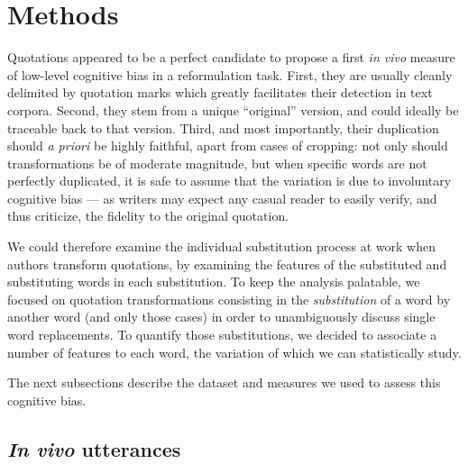 \section{Methods} %
\label{sec:protocol}

Quotations appeared to be a perfect candidate to propose a first \emph{in vivo} measure of low-level cognitive bias in a reformulation task. %
First, they are usually cleanly delimited by quotation marks %
which greatly facilitates their detection in text corpora.
Second, they stem from a unique ``original'' version, and could ideally be traceable back to that version.
Third, and most importantly, their duplication should \emph{a priori} be highly faithful, apart from cases of cropping: not only should transformations be of moderate magnitude, but when specific words are not perfectly duplicated, it is safe to assume that the variation is due to involuntary cognitive bias --- as writers may expect any casual reader to easily verify, and thus criticize, the fidelity to the original quotation.


We could therefore examine the individual substitution process at work when authors transform quotations, by examining the features of the substituted and substituting words in each substitution. To keep the analysis palatable, we focused on quotation transformations consisting in the \emph{substitution} of a word by another word (and only those cases) in order to unambiguously discuss single word replacements. 
To quantify those substitutions, we decided to associate a number of features to each word, the variation of which we can statistically study.

The next subsections describe the dataset and measures we used to assess this cognitive bias.

\subsection{\emph{In vivo} utterances}

